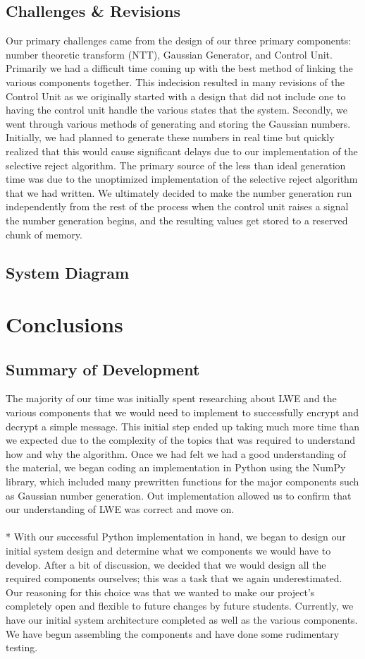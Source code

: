 \documentclass{article}
\begin{document}
\subsection{Challenges \& Revisions }
Our primary challenges came from the design of our three primary components: number theoretic transform (NTT), Gaussian Generator, and Control Unit. Primarily we had a difficult time coming up with the best method of linking the various components together. This indecision resulted in many revisions of the Control Unit as we originally started with a design that did not include one to having the control unit handle the various states that the system. Secondly, we went through various methods of generating and storing the Gaussian numbers. Initially, we had planned to generate these numbers in real time but quickly realized that this would cause significant delays due to our implementation of the selective reject algorithm. The primary source of the less than ideal generation time was due to the unoptimized implementation of the selective reject algorithm that we had written. We ultimately decided to make the number generation run independently from the rest of the process when the control unit raises a signal the number generation begins, and the resulting values get stored to a reserved chunk of memory.
\subsection{System Diagram}


\section{Conclusions}
\subsection{Summary of Development}
The majority of our time was initially spent researching about LWE and the various components that we would need to implement to successfully encrypt and decrypt a simple message. This initial step ended up taking much more time than we expected due to the complexity of the topics that was required to understand how and why the algorithm. Once we had felt we had a good understanding of the material, we began coding an implementation in Python using the NumPy library, which included many prewritten functions for the major components such as Gaussian number generation. Out implementation allowed us to confirm that our understanding of LWE was correct and move on.
\\
\\*
With our successful Python implementation in hand, we began to design our initial system design and determine what we components we would have to develop. After a bit of discussion, we decided that we would design all the required components ourselves; this was a task that we again underestimated. Our reasoning for this choice was that we wanted to make our project’s completely open and flexible to future changes by future students. Currently, we have our initial system architecture completed as well as the various components. We have begun assembling the components and have done some rudimentary testing.
\end{document}
